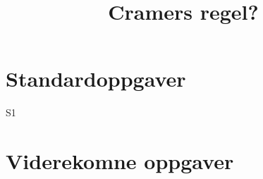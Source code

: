 \documentclass[a4paper,norsk,11pt]{interaktiv}
\title{Cramers regel?}
\begin{document}

\maketitle


\begin{tcolorbox}
\end{tcolorbox}



\section*{Standardoppgaver}


\begin{oppgave}{S1}
\end{oppgave}

\section*{Viderekomne oppgaver}
\end{document}
